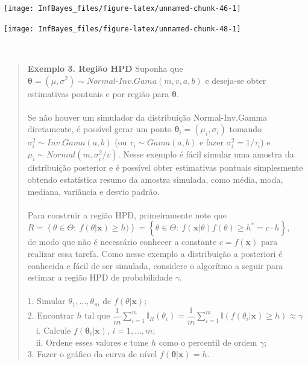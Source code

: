 \documentclass[
]{book}
\begin{document}
\begin{center}\texttt{[image: InfBayes\_files/figure-latex/unnamed-chunk-46-1]} \end{center}

\begin{center}\texttt{[image: InfBayes\_files/figure-latex/unnamed-chunk-48-1]} \end{center}

\(~\)

\begin{quote}
\textbf{Exemplo 3. Região HPD} Suponha que \(\boldsymbol \theta=(\mu,\sigma^2) \sim \textit{Normal-Inv.Gama}(m,v,a,b)\) e deseja-se obter estimativas pontuais e por região para \(\boldsymbol \theta\).\\
\(~\)\\
Se não houver um simulador da distribuição Normal-Inv.Gamma diretamente, é possível gerar um ponto \(\boldsymbol \theta_i=(\mu_i,\sigma_i)\) tomando \({\sigma}_i^2 \sim \textit{Inv.Gama}(a,b)\) (ou \(\tau_i \sim \textit{Gama}(a,b)\) e fazer \({\sigma}_i^2=1/\tau_i\)) e \(\mu_i \sim \textit{Normal}(m,{\sigma}_i^2/v)\). Nesse exemplo é fácil simular uma amostra da distribuição posterior e é possível obter estimativas pontuais simplesmente obtendo estatística resumo da amostra simulada, como média, moda, mediana, variância e desvio padrão.\\
\(~\)\\
Para construir a região HPD, primeiramente note que\\
\(R=\left\{\theta\in\Theta :~f(\theta | \boldsymbol x)\geq h)\right\}=\left\{\theta\in\Theta:~f(\boldsymbol x|\theta)f(\theta)\geq h^*=c\cdot h\right\}\),\\
de modo que não é necessário conhecer a constante \(c=f(\boldsymbol x)\) para realizar essa tarefa. Como nesse exemplo a distribuição a posteriori é conhecida e fácil de ser simulada, considere o algorítmo a seguir para estimar a região HPD de probabilidade \(\gamma\).\\
\(~\)\\
1. Simular \(\theta_1,...,\theta_m\) de \(f(\theta|\boldsymbol x)\);\\
2. Encontrar \(h\) tal que \(\displaystyle \dfrac{1}{m}\sum_{i=1}^m\mathbb{I}_{R}(\theta_i)=\dfrac{1}{m}\sum_{i=1}^m\mathbb{I}(f(\theta_i|\boldsymbol x)\geq h)\approx \gamma\)\\
\(~~~\) i. Calcule \(f(\boldsymbol \theta_i|\boldsymbol x)\), \(i=1,\ldots,m\);\\
\(~~~\) ii. Ordene esses valores e tome \(h\) como o percentil de ordem \(\gamma\);\\
3. Fazer o gráfico da curva de nível \(f(\boldsymbol\theta |\boldsymbol x)=h\).
\end{quote}
\end{document}
